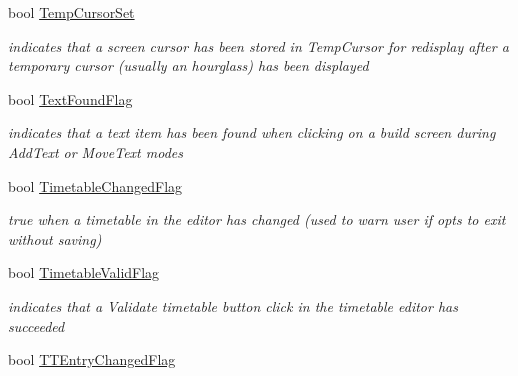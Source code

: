 \begin{DoxyCompactItemize}
\mbox{\label{class_t_interface_a069490da193b0cd917842b07dbd1b145}} 
bool \mbox{\hyperlink{class_t_interface_a069490da193b0cd917842b07dbd1b145}{Temp\+Cursor\+Set}}
\begin{DoxyCompactList}\small\item\em indicates that a screen cursor has been stored in Temp\+Cursor for redisplay after a temporary cursor (usually an hourglass) has been displayed \end{DoxyCompactList}\item 
\mbox{\label{class_t_interface_a22cc2e8a912114628025f065d43d699c}} 
bool \mbox{\hyperlink{class_t_interface_a22cc2e8a912114628025f065d43d699c}{Text\+Found\+Flag}}
\begin{DoxyCompactList}\small\item\em indicates that a text item has been found when clicking on a build screen during \textquotesingle{}Add\+Text\textquotesingle{} or \textquotesingle{}Move\+Text\textquotesingle{} modes \end{DoxyCompactList}\item 
\mbox{\label{class_t_interface_a1cf45c2ae9952b143d022ed2b46fa2fd}} 
bool \mbox{\hyperlink{class_t_interface_a1cf45c2ae9952b143d022ed2b46fa2fd}{Timetable\+Changed\+Flag}}
\begin{DoxyCompactList}\small\item\em true when a timetable in the editor has changed (used to warn user if opts to exit without saving) \end{DoxyCompactList}\item 
\mbox{\label{class_t_interface_a37aeb05f6d0f1cb639e31e5c8467cadd}} 
bool \mbox{\hyperlink{class_t_interface_a37aeb05f6d0f1cb639e31e5c8467cadd}{Timetable\+Valid\+Flag}}
\begin{DoxyCompactList}\small\item\em indicates that a \textquotesingle{}Validate timetable\textquotesingle{} button click in the timetable editor has succeeded \end{DoxyCompactList}\item 
\mbox{\label{class_t_interface_a615a33846b3930ea4691e786912c2ce0}} 
bool \mbox{\hyperlink{class_t_interface_a615a33846b3930ea4691e786912c2ce0}{T\+T\+Entry\+Changed\+Flag}}

\end{DoxyCompactItemize}

